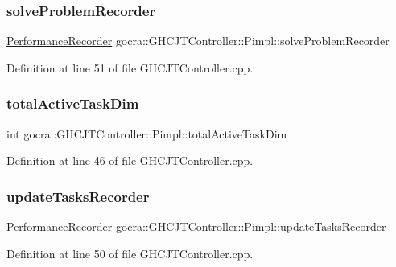 \subsubsection{\texorpdfstring{solve\+Problem\+Recorder}{solveProblemRecorder}}
{\footnotesize\ttfamily \hyperlink{classgocra_1_1PerformanceRecorder}{Performance\+Recorder} gocra\+::\+G\+H\+C\+J\+T\+Controller\+::\+Pimpl\+::solve\+Problem\+Recorder}



Definition at line 51 of file G\+H\+C\+J\+T\+Controller.\+cpp.

\hypertarget{structgocra_1_1GHCJTController_1_1Pimpl_a9814826f2b30accde751b9f343b3590b}{}\label{structgocra_1_1GHCJTController_1_1Pimpl_a9814826f2b30accde751b9f343b3590b} 
\subsubsection{\texorpdfstring{total\+Active\+Task\+Dim}{totalActiveTaskDim}}
{\footnotesize\ttfamily int gocra\+::\+G\+H\+C\+J\+T\+Controller\+::\+Pimpl\+::total\+Active\+Task\+Dim}



Definition at line 46 of file G\+H\+C\+J\+T\+Controller.\+cpp.

\hypertarget{structgocra_1_1GHCJTController_1_1Pimpl_a7305b9fe096cfd38ba50af0797484a6a}{}\label{structgocra_1_1GHCJTController_1_1Pimpl_a7305b9fe096cfd38ba50af0797484a6a} 
\subsubsection{\texorpdfstring{update\+Tasks\+Recorder}{updateTasksRecorder}}
{\footnotesize\ttfamily \hyperlink{classgocra_1_1PerformanceRecorder}{Performance\+Recorder} gocra\+::\+G\+H\+C\+J\+T\+Controller\+::\+Pimpl\+::update\+Tasks\+Recorder}



Definition at line 50 of file G\+H\+C\+J\+T\+Controller.\+cpp.

